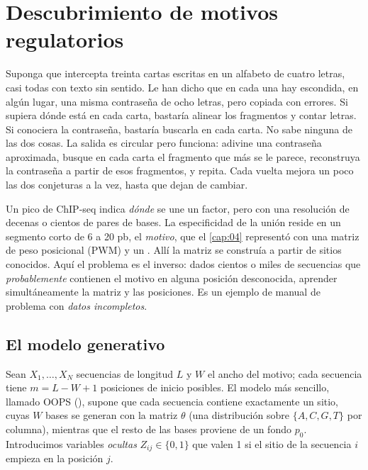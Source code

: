 \section{Descubrimiento de motivos regulatorios}\label{sec:13-motivos}

\begin{intuicion}
Suponga que intercepta treinta cartas escritas en un alfabeto de cuatro letras, casi todas con texto sin sentido. Le han dicho que en cada una hay escondida, en algún lugar, una misma contraseña de ocho letras, pero copiada con errores. Si supiera dónde está en cada carta, bastaría alinear los fragmentos y contar letras. Si conociera la contraseña, bastaría buscarla en cada carta. No sabe ninguna de las dos cosas. La salida es circular pero funciona: adivine una contraseña aproximada, busque en cada carta el fragmento que más se le parece, reconstruya la contraseña a partir de esos fragmentos, y repita. Cada vuelta mejora un poco las dos conjeturas a la vez, hasta que dejan de cambiar.
\end{intuicion}

Un pico de ChIP-seq indica \emph{dónde} se une un factor, pero con una resolución de decenas o cientos de pares de bases. La especificidad de la unión reside en un segmento corto de 6 a 20 pb, el \emph{motivo}, que el \cref{cap:04} representó con una matriz de peso posicional (PWM) y un . Allí la matriz se construía a partir de sitios conocidos. Aquí el problema es el inverso: dados cientos o miles de secuencias que \emph{probablemente} contienen el motivo en alguna posición desconocida, aprender simultáneamente la matriz y las posiciones. Es un ejemplo de manual de problema con \emph{datos incompletos}.

\subsection{El modelo generativo}

Sean $X_1,\dots,X_N$ secuencias de longitud $L$ y $W$ el ancho del motivo; cada secuencia tiene $m=L-W+1$ posiciones de inicio posibles. El modelo más sencillo, llamado OOPS (), supone que cada secuencia contiene exactamente un sitio, cuyas $W$ bases se generan con la matriz $\theta$ (una distribución sobre $\{A,C,G,T\}$ por columna), mientras que el resto de las bases proviene de un fondo $p_0$. Introducimos variables \emph{ocultas} $Z_{ij}\in\{0,1\}$ que valen 1 si el sitio de la secuencia $i$ empieza en la posición $j$.


